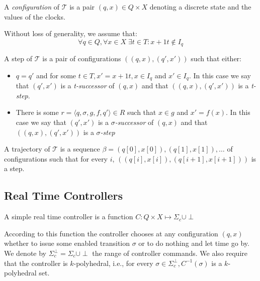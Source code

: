\documentclass[table]{beamer}
\newcommand{\confPair}{\ensuremath{((q,x),(q',x'))}}
\begin{document}
\begin{frame}
	A \emph{configuration} of $\mathcal{T}$ is a pair $(q,x) \in Q \times X$ denoting a discrete
	state and the values of the clocks.

	\medskip

	Without loss of generality, we assume that:
	$$ \forall q \in Q, \forall x \in X \; \exists t \in T : x+1t \not \in I_q$$
\end{frame}
\begin{frame}
	\begin{dfn}
		A step of $\mathcal{T}$ is a pair of configurations $\confPair$ such that either:
		\begin{itemize}
			\item $q=q'$ and for some $t \in T, x'=x+1t, x \in I_q$ and $x' \in I_q$. In this case we say that $(q',x')$ is a \emph{t-successor} of $(q,x)$ and that $\confPair$ is a \emph{t-step}.
			\item There is some $r = \langle q,\sigma,g,f,q'\rangle \in R$ such that $x \in g$ and $x' = f(x)$. In this case we say that $(q',x')$ is a \emph{$\sigma$-successor} of $(q,x)$ and that $\confPair$ is a \emph{$\sigma$-step} 
		\end{itemize}
		
		\medskip
		
		A trajectory of $\mathcal{T}$ is a sequence $ \beta = (q[0],x[0]),(q[1],x[1]),\ldots $ of configurations such that for every $i$, $((q[i],x[i]),(q[i+1],x[i+1]))$ is a step.
	\end{dfn}
\end{frame}

\subsection{Real Time Controllers}
\begin{frame}
	\begin{dfn}
		A simple real time controller is a function $C: Q \times X \mapsto \Sigma_c \cup {\perp}$
	\end{dfn}
	According to this function the controller chooses at any configuration $(q,x)$ whether to issue some enabled transition $\sigma$ or to do nothing and let time go by. We denote by $\Sigma_c^\perp = \Sigma_c \cup {\perp}$ the range of controller commands. We also require that the controller is $k$-polyhedral, i.e., for every $\sigma \in \Sigma_c^\perp, C^{-1}(\sigma)$ is  a $k$-polyhedral set.
\end{frame}
\end{document}
